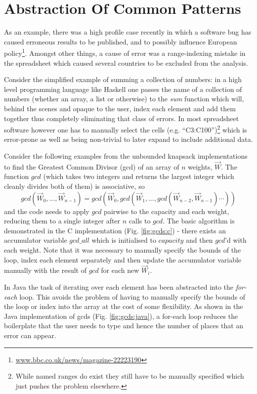 \section{Abstraction Of Common Patterns}
As an example, there was a high profile case recently\cite{Herndon13} in which a
software bug has caused erroneous results to be published, and to possibly influence European policy\footnote{\url{www.bbc.co.uk/news/magazine-22223190}}. Amongst other things, a cause of error was a range-indexing mistake in the spreadsheet which caused several countries to be excluded from the analysis.

Consider the simplified example of summing a collection of numbers: in a high level programming language like Haskell one passes the name of a collection of numbers (whether an array, a list or otherwise) to the \emph{sum} function which will, behind the scenes and opaque to the user, index each element and add them together thus completely eliminating that class of errors. In most spreadsheet software however one has to manually select the cells (e.g. ``C3:C100'')\footnote{While named ranges do exist they still have to be manually specified which just pushes the problem elsewhere.} which is error-prone as well as being non-trivial to later expand to include additional data.

Consider the following examples from the unbounded knapsack implementations to find the Greatest Common Divisor (gcd) of an array of $n$ weights, $\vec{W}$. The function $gcd$ (which takes two integers and returns the largest integer which cleanly divides both of them) is associative, so $$ gcd (\vec{W}_0, \ldots, \vec{W}_{n-1}) =  gcd(\vec{W}_0,gcd(\vec{W}_1, \ldots,gcd (\vec{W}_{n-2},\vec{W}_{n-1})\cdots)) $$ and the code needs to apply $gcd$ pairwise to the capacity and each weight, reducing them to a single integer after $n$ calls to $gcd$. The basic algorithm is demonstrated in the C implementation (Fig. \ref{fig:gcds:c}) - there exists an accumulator variable $gcd\_all$ which is initialised to $capacity$ and then $gcd$'d with each weight. Note that it was necessary to manually specify the bounds of the loop, index each element separately and then update the accumulator variable manually with the result of $gcd$ for each new $\vec{W}_i$.

In Java the task of iterating over each element has been abstracted into the \emph{for-each} loop. This avoids the problem of having to manually specify the bounds of the loop or index into the array at the cost of some flexibility. As shown in the Java implementation of gcds (Fig. \ref{fig:gcds:java}), a for-each loop reduces the boilerplate that the user needs to type and hence the number of places that an error can appear.

